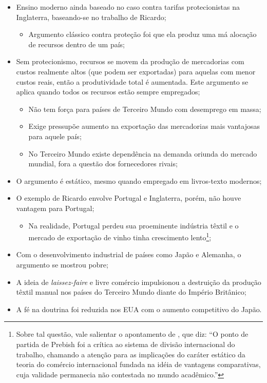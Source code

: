 	\begin{itemize}
		\item Ensino moderno ainda baseado no caso contra tarifas protecionistas na Inglaterra, baseando-se no trabalho de Ricardo;
			\begin{itemize}
				\item Argumento clássico contra proteção foi que ela produz uma má alocação de recursos dentro de um país;
			\end{itemize}
		\item Sem protecionismo, recursos se movem da produção de mercadorias com custos realmente altos (que podem ser exportadas) para aquelas com menor custos reais, então a produtividade total é aumentada. Este argumento se aplica quando todos os recursos estão sempre empregados;
			\begin{itemize}
				\item Não tem força para países de Terceiro Mundo com desemprego em massa;
				\item Exige pressupõe aumento na exportação das mercadorias mais vantajosas para aquele país;
				\item No Terceiro Mundo existe dependência na demanda oriunda do mercado mundial, fora a questão dos fornecedores rivais;
			\end{itemize}
		\item O argumento é estático, mesmo quando empregado em livros-texto modernos;
		\item O exemplo de Ricardo envolve Portugal e Inglaterra, porém, não houve vantagem para Portugal;
			\begin{itemize}
				\item Na realidade, Portugal perdeu sua proeminente indústria têxtil e o mercado de exportação de vinho tinha crescimento lento\footnote{Sobre tal questão, vale salientar o apontamento de , que diz: ``O ponto de partida de Prebish foi a crítica ao sistema de divisão internacional do trabalho, chamando a atenção para as implicações do caráter estático da teoria do comércio internacional fundada na idéia de vantagens comparativas, cuja validade permanecia não contestada no mundo acadêmico.''};
			\end{itemize}
		\item Com o desenvolvimento industrial de países como Japão e Alemanha, o argumento se mostrou pobre;
		\item A ideia de \textit{laissez-faire} e livre comércio impulsionou a destruição da produção têxtil manual nos países do Terceiro Mundo diante do Império Britânico;
		\item A fé na doutrina foi reduzida nos EUA com o aumento competitivo do Japão.
	\end{itemize}
	
